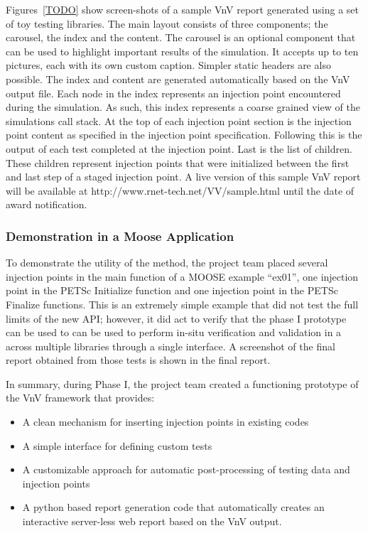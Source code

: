 Figures~\ref{TODO} show screen-shots of a sample VnV report generated using a set of toy testing libraries. The main layout consists of three components; the carousel, the index and the content. The carousel is an optional component that can be used to highlight important results of the simulation. It accepts up to ten pictures, each with its own custom caption. Simpler static headers are also possible. The index and content are generated automatically based on the VnV output file. Each node in the index represents an injection point encountered during the simulation. As such, this index represents a coarse grained view of the simulations call stack. At the top of each injection point section is the injection point content as specified in the injection point specification. Following this is the output of each test completed at the injection point. Last is the list of children. These children represent injection points that were initialized between the first and last step of a staged injection point. A live version of this sample VnV report will be available at http://www.rnet-tech.net/VV/sample.html until the date of award notification. 

\subsubsection{ Demonstration in a Moose Application } 
To demonstrate the utility of the method, the project team placed several injection points 
in the main function of a MOOSE example ``ex01'', one injection point in the PETSc Initialize function and 
one injection point in the PETSc Finalize functions. This is an extremely simple example that 
did not test the full limits of the new API; however, it did act to verify that the phase I prototype 
can be used to can be used to perform in-situ verification and validation in a across multiple libraries 
through a single interface. A screenshot of the final \VV report obtained from those tests is shown in the 
final report. 

In summary, during Phase I, the project team created a functioning prototype of the VnV framework that provides:
\begin{itemize}
 \item A clean mechanism for inserting injection points in existing codes
 \item A simple interface for defining custom tests 
 \item A customizable approach for automatic post-processing of testing data and injection points
 \item A python based report generation code that automatically creates an interactive server-less web report based on the VnV output.
\end{itemize}

